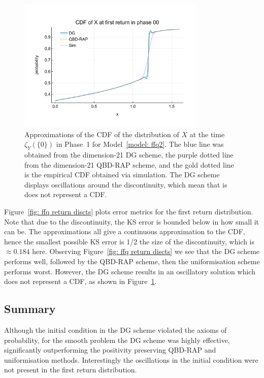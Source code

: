 \begin{figure}[h] 
	\centering
	\includegraphics[width=0.8\textwidth,trim={0cm 1.25cm 0cm 1.25cm},clip]{chapter6/figs/ffq/discts/phase_4_cdf.pdf}%
	\caption{Approximations of the CDF of the distribution of \(X\) at the time \(\zeta_Y(\{0\})\) in Phase~1 for Model~\ref{model: ffq2}. The blue line was obtained from the dimension-21 DG scheme, the purple dotted line from the dimension-21 QBD-RAP scheme, and the gold dotted line is the empirical CDF obtained via simulation. The DG scheme displays oscillations around the discontinuity, which mean that is does not represent a CDF.} 
	\label{fig: ffq2 oscillation} 
\end{figure}
Figure~\ref{fig: ffq return discts} plots error metrics for the first return distribution. Note that due to the discontinuity, the KS error is bounded below in how small it can be. The approximations all give a continuous approximation to the CDF, hence the smallest possible KS error is 1/2 the size of the discontinuity, which is \(\approx 0.184\) here. Observing Figure~\ref{fig: ffq return discts} we see that the DG scheme performs well, followed by the QBD-RAP scheme, then the uniformisation scheme performs worst. However, the DG scheme results in an oscillatory solution which does not represent a CDF, as shown in Figure~\ref{fig: ffq2 oscillation}.


\subsection{Summary}
Although the initial condition in the DG scheme violated the axioms of probability, for the smooth problem the DG scheme was highly effective, significantly outperforming the positivity preserving QBD-RAP and uniformisation methods. Interestingly the oscillations in the initial condition were not present in the first return distribution. 


